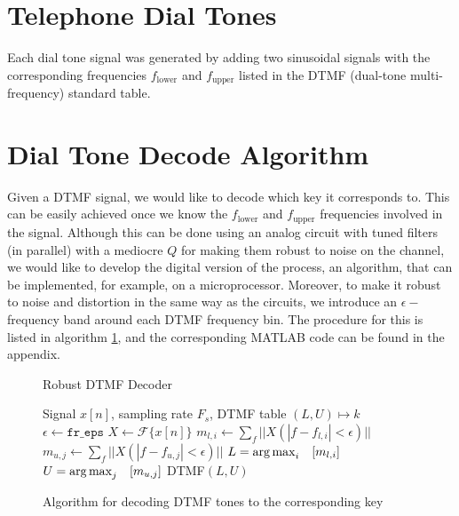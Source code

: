 \documentclass[10pt]{article}
\begin{document}
\section{Telephone Dial Tones}
Each dial tone signal was generated by adding two sinusoidal signals with the corresponding frequencies $f_\text{lower}$ and $f_\text{upper}$ listed in the DTMF (dual-tone multi-frequency) standard table.

\section{Dial Tone Decode Algorithm}
Given a DTMF signal, we would like to decode which key it corresponds to. This can be easily achieved once we know the $f_\text{lower}$ and $f_\text{upper}$ frequencies involved in the signal. Although this can be done using an analog circuit with tuned filters (in parallel) with a mediocre $Q$ for making them robust to noise on the channel, we would like to develop the digital version of the process, an algorithm, that can be implemented, for example, on a microprocessor. Moreover, to  make it robust to noise and distortion in the same way as the circuits, we introduce an $\epsilon -$frequency band around each DTMF frequency bin. The procedure for this is listed in algorithm \ref{alg:dtmf_decode_algorithm}, and the corresponding \textsc{MATLAB} code can be found in the appendix.

\begin{figure}[ht]
  \centering
  \begin{minipage}{.64\linewidth}
        \begin{algorithm}[H]
            \caption{Robust DTMF Decoder}
            \label{alg:dtmf_decode_algorithm}
            \begin{algorithmic}
                \Require Signal $x[n]$, sampling rate $F_s$, DTMF table $(L, U) \mapsto k$
                \State $\epsilon \gets \texttt{fr\_eps}$
                \State $X \gets \mathcal{F}\{x[n]\}$ 
                    \State $m_{l, i} \gets \sum_f||X(|f-f_{l,i}| < \epsilon)||$
                    \State $m_{u, j} \gets \sum_f||X(|f-f_{u,j}| < \epsilon)||$
                \EndFor
                \State $L = \operatorname*{arg\,max}_i \quad [m_{l, i}]$  
                \State $U = \operatorname*{arg\,max}_j \quad [m_{u, j}]$
                \State \Return DTMF$(L, U)$ 
            \end{algorithmic}
        \end{algorithm}
    \end{minipage}
    \caption{Algorithm for decoding DTMF tones to the corresponding key}
\end{figure}
\end{document}
